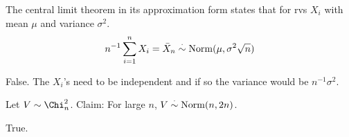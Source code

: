 \documentclass[tf-tutorial-all.tex]{subfiles}
\begin{document}
\begin{truefalse}
  The central limit theorem in its approximation form states that for
  rvs $X_i$ with mean $\mu$ and variance $\sigma^2$.
  $$ n^{-1}\sum_{i=1}^n X_i = \bar X_n \stackrel{\cdot}\sim \mathrm{Norm}(\mu, \sigma^2 \sqrt{n}) $$
\begin{solution}
False. The $X_i$'s need to be independent and if so the variance would be $n^{-1}\sigma^2$.
\end{solution}
\end{truefalse}

\begin{truefalse}
  Let $V \sim \Chi^2_n$. Claim: For large $n$, $V \stackrel{\cdot}\sim \mathrm{Norm}(n, 2n)$.
\begin{solution}
True.
\end{solution}
\end{truefalse}
\end{document}
